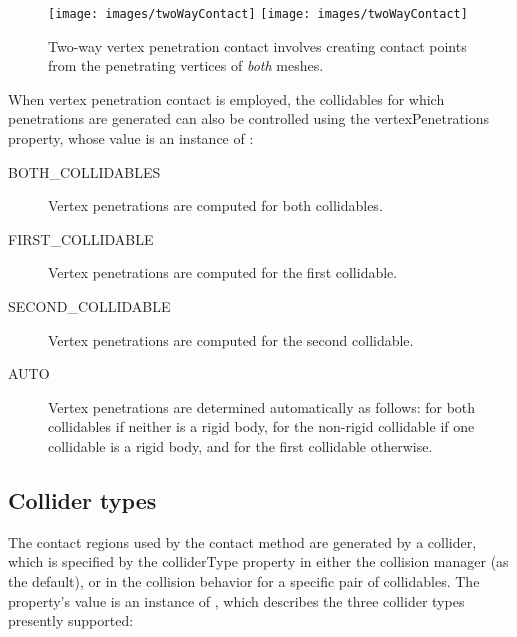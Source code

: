 \begin{figure}[ht]
\begin{center}
\iflatexml
 \texttt{[image: images/twoWayContact]}
\else
 \texttt{[image: images/twoWayContact]}
\fi
\end{center}
\caption{Two-way vertex penetration contact involves creating
contact points from the penetrating vertices of {\it both}
meshes.}
\label{TwoWayContact:fig}
\end{figure}

When vertex penetration contact is employed, the collidables for which
penetrations are generated can also be controlled using the {\sf
vertexPenetrations} property, whose value is an instance of
:

\begin{description}

\item[BOTH\_COLLIDABLES]\mbox{}

Vertex penetrations are computed for both collidables.

\item[FIRST\_COLLIDABLE]\mbox{}

Vertex penetrations are computed for the first collidable.

\item[SECOND\_COLLIDABLE]\mbox{}

Vertex penetrations are computed for the second collidable.

\item[AUTO]\mbox{}

Vertex penetrations are determined automatically as follows: for both
collidables if neither is a rigid body, for the non-rigid collidable
if one collidable is a rigid body, and for the first collidable
otherwise.

\end{description}

\subsection{Collider types}
\label{ColliderTypes:sec}

The contact regions used by the contact method are generated by
a collider, which is specified by the {\sf colliderType} property in
either the collision manager (as the default), or in the collision
behavior for a specific pair of collidables. The property's value is an
instance of
,
which describes the three collider types presently supported:

